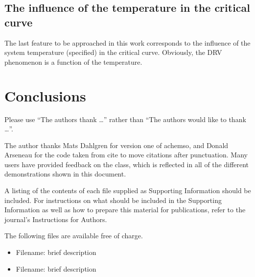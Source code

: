 \documentclass[journal=iecred,manuscript=article]{achemso}
\theoremstyle{definition}
\theoremstyle{remark}
\begin{document}
\subsection{The influence of the temperature in the critical curve}

The last feature to be approached in this work corresponds to the influence of the system temperature (specified) in the critical curve. Obviously, the DRV phenomenon is a function of the temperature. 

\section{Conclusions}


\begin{acknowledgement}

Please use ``The authors thank \ldots'' rather than ``The
authors would like to thank \ldots''.

The author thanks Mats Dahlgren for version one of \textsf{achemso},
and Donald Arseneau for the code taken from \textsf{cite} to move
citations after punctuation. Many users have provided feedback on the
class, which is reflected in all of the different demonstrations
shown in this document.

\end{acknowledgement}

\begin{suppinfo}

A listing of the contents of each file supplied as Supporting Information
should be included. For instructions on what should be included in the
Supporting Information as well as how to prepare this material for
publications, refer to the journal's Instructions for Authors.

The following files are available free of charge.
\begin{itemize}
  \item Filename: brief description
  \item Filename: brief description
\end{itemize}

\end{suppinfo}


\end{document}
